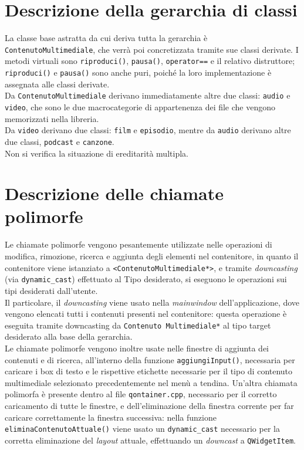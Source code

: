 \documentclass[a4paper,10pt]{article}
\begin{document}
\section{Descrizione della gerarchia di classi}
La classe base astratta da cui deriva tutta la gerarchia è \texttt{ContenutoMultimediale}, che verrà poi concretizzata tramite sue classi derivate. I metodi virtuali sono \texttt{riproduci()}, \texttt{pausa()}, \texttt{operator==} e il relativo distruttore; \texttt{riproduci()} e \texttt{pausa()} sono anche puri, poiché la loro implementazione è assegnata alle classi derivate. \\
Da \texttt{ContenutoMultimediale} derivano immediatamente altre due classi: \texttt{audio} e \texttt{video}, che sono le due macrocategorie di appartenenza dei file che vengono memorizzati nella libreria. \\
Da \texttt{video} derivano due classi: \texttt{film} e \texttt{episodio}, mentre da \texttt{audio} derivano altre due classi, \texttt{podcast} e \texttt{canzone}. \\
Non si verifica la situazione di ereditarità multipla. \\


\section{Descrizione delle chiamate polimorfe}
Le chiamate polimorfe vengono pesantemente utilizzate nelle operazioni di modifica, rimozione, ricerca e aggiunta degli elementi nel contenitore, in quanto il contenitore viene istanziato a \texttt{<ContenutoMultimediale*>}, e tramite \textit{downcasting} (via \texttt{dynamic\_cast}) effettuato al Tipo desiderato, si eseguono le operazioni sui tipi desiderati dall'utente. \\
Il particolare, il \textit{downcasting} viene usato nella \textit{mainwindow} dell'applicazione, dove vengono elencati tutti i contenuti presenti nel contenitore: questa operazione è eseguita tramite downcasting da \texttt{Contenuto Multimediale*} al tipo target desiderato alla base della gerarchia.\\
Le chiamate polimorfe vengono inoltre usate nelle finestre di aggiunta dei contenuti e di ricerca, all'interno della funzione \texttt{aggiungiInput()}, necessaria per caricare i box di testo e le rispettive etichette necessarie per il tipo di contenuto multimediale selezionato precedentemente nel menù a tendina.
Un'altra chiamata polimorfa è presente dentro al file \texttt{qontainer.cpp}, necessario per il corretto caricamento di tutte le finestre, e dell'eliminazione della finestra corrente per far caricare correttamente la finestra successiva: nella funzione \texttt{eliminaContenutoAttuale()} viene usato un \texttt{dynamic\_cast} necessario per la corretta eliminazione del \textit{layout} attuale, effettuando un \textit{downcast} a \texttt{QWidgetItem}.
\end{document}
